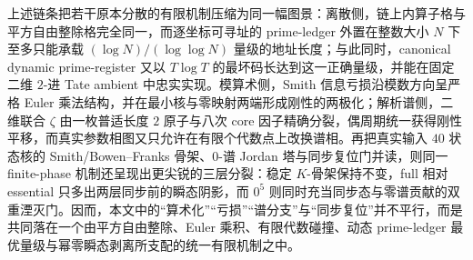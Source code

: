 \noindent
上述链条把若干原本分散的有限机制压缩为同一幅图景：离散侧，链上内算子格与平方自由整除格完全同一，而逐坐标可寻址的 prime-ledger 外置在整数大小 \(N\) 下至多只能承载 \((\log N)/(\log\log N)\) 量级的地址长度；与此同时，canonical dynamic prime-register 又以 \(T\log T\) 的最坏码长达到这一正确量级，并能在固定二维 \(2\)-进 Tate ambient 中忠实实现。模算术侧，Smith 信息亏损沿模数方向呈严格 Euler 乘法结构，并在最小核与零映射两端形成刚性的两极化；解析谱侧，二维联合 \(\zeta\) 由一枚普适长度 \(2\) 原子与八次 core 因子精确分裂，偶周期统一获得刚性平移，而真实参数相图又只允许在有限个代数点上改换谱相。再把真实输入 \(40\) 状态核的 Smith/Bowen--Franks 骨架、\(0\)-谱 Jordan 塔与同步复位门并读，则同一 finite-phase 机制还呈现出更尖锐的三层分裂：稳定 \(K\)-骨架保持不变，full 相对 essential 只多出两层同步前的瞬态阴影，而 \(0^5\) 则同时充当同步态与零谱贡献的双重湮灭门。因而，本文中的“算术化”“亏损”“谱分支”与“同步复位”并不平行，而是共同落在一个由平方自由整除、Euler 乘积、有限代数碰撞、动态 prime-ledger 最优量级与幂零瞬态剥离所支配的统一有限机制之中。

\endinput
